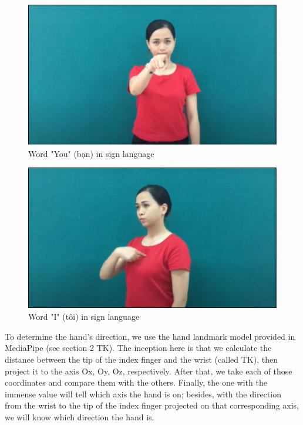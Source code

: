 \begin{figure}[H]
	\centering
	\includegraphics[width=\textwidth]{img/Chap4/WordYouInSignLanguage.png}
	\caption{Word "You" (bạn) in sign language}
	\label{fig:Chap4-WordYouInSignLanguage}
\end{figure}

\begin{figure}[H]
	\centering
	\includegraphics[width=\textwidth]{img/Chap4/WordIInSignLanguage.png}
	\caption{Word "I" (tôi) in sign language}
	\label{fig:Chap4-WordIInSignLanguage}
\end{figure}

To determine the hand's direction, we use the hand landmark model provided in MediaPipe (see section 2 TK). The inception here is that we calculate the distance between the tip of the index finger and the wrist (called TK), then project it to the axis Ox, Oy, Oz, respectively. After that, we take each of those coordinates and compare them with the others. Finally, the one with the immense value will tell which axis the hand is on; besides, with the direction from the wrist to the tip of the index finger projected on that corresponding axis, we will know which direction the hand is.

